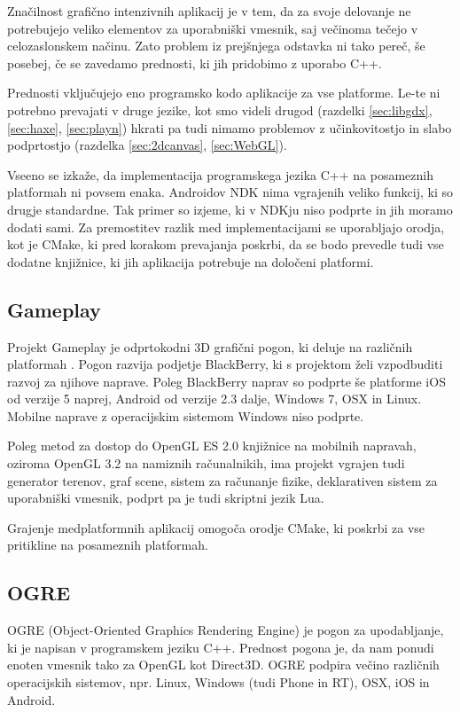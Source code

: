 Značilnost grafično intenzivnih aplikacij je v tem, da za svoje delovanje ne potrebujejo veliko elementov za uporabniški vmesnik, saj večinoma tečejo v celozaslonskem načinu. Zato problem iz prejšnjega odstavka ni tako pereč, še posebej, če se zavedamo prednosti, ki jih pridobimo z uporabo C++. 

Prednosti vključujejo eno programsko kodo aplikacije za vse platforme. Le-te ni potrebno prevajati v druge jezike, kot smo videli drugod (razdelki \ref{sec:libgdx}, \ref{sec:haxe}, \ref{sec:playn}) hkrati pa tudi nimamo problemov z učinkovitostjo in slabo podprtostjo (razdelka \ref{sec:2dcanvas}, \ref{sec:WebGL}).

Vseeno se izkaže, da implementacija programskega jezika C++ na posameznih platformah ni povsem enaka. Androidov NDK nima vgrajenih veliko funkcij, ki so drugje standardne. Tak primer so izjeme, ki v NDKju niso podprte in jih moramo dodati sami. Za premostitev razlik med implementacijami se uporabljajo orodja, kot je CMake, ki pred korakom prevajanja poskrbi, da se bodo prevedle tudi vse dodatne knjižnice, ki jih aplikacija potrebuje na določeni platformi.

\subsection{Gameplay}

Projekt Gameplay je odprtokodni 3D grafični pogon, ki deluje na različnih platformah \cite{gameplay}. Pogon razvija podjetje BlackBerry, ki s projektom želi vzpodbuditi razvoj za njihove naprave. Poleg BlackBerry naprav so podprte še platforme iOS od verzije 5 naprej, Android od verzije 2.3 dalje, Windows 7, OSX in Linux. Mobilne naprave z operacijskim sistemom Windows niso podprte.

Poleg metod za dostop do OpenGL ES 2.0 knjižnice na mobilnih napravah, oziroma OpenGL 3.2 na namiznih računalnikih, ima projekt vgrajen tudi generator terenov, graf scene, sistem za računanje fizike, deklarativen sistem za uporabniški vmesnik, podprt pa je tudi skriptni jezik Lua.

Grajenje medplatformnih aplikacij omogoča orodje CMake, ki poskrbi za vse pritikline na posameznih platformah. 

\subsection{OGRE}
\label{sec:ogre}
OGRE (Object-Oriented Graphics Rendering Engine) \cite{ogre} je pogon za upodabljanje, ki je napisan v programskem jeziku C++. Prednost pogona je, da nam ponudi enoten vmesnik tako za OpenGL kot Direct3D. OGRE podpira večino različnih operacijskih sistemov, npr. Linux, Windows (tudi Phone in RT), OSX, iOS in Android.

